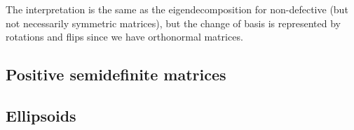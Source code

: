 \begin{warning}
    The interpretation is the same as the eigendecomposition for non-defective (but not necessarily symmetric matrices), but the change of basis is represented by rotations and flips since we have orthonormal matrices. 
\end{warning}

\subsection{Positive semidefinite matrices}
\subsection{Ellipsoids}